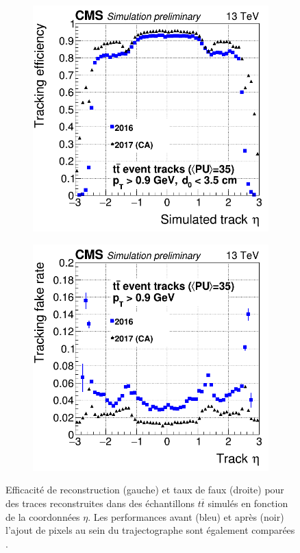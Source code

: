 \begin{figure}
  \begin{subfigure}{0.5\linewidth}
    \centering
    \includegraphics[width=0.95\linewidth]{Chapitre4/Images/efficiency_eta_1.png} 
    \caption*{} 
  \end{subfigure}
  \begin{subfigure}{0.5\linewidth}
    \centering
    \includegraphics[width=0.95\linewidth]{Chapitre4/Images/fake_eta_1.png} 
    \caption*{} 
  \end{subfigure} 
  \caption{Efficacité de reconstruction (gauche) et taux de faux (droite) pour des traces reconstruites dans des échantillons $t\overline{t}$ simulés en fonction de la coordonnées $\eta$. Les performances avant (bleu) et après (noir) l'ajout de pixels au sein du trajectographe sont également comparées \cite{Elmetenawee:2020emw}.}
  \label{etatrackefficiency}
\end{figure}

